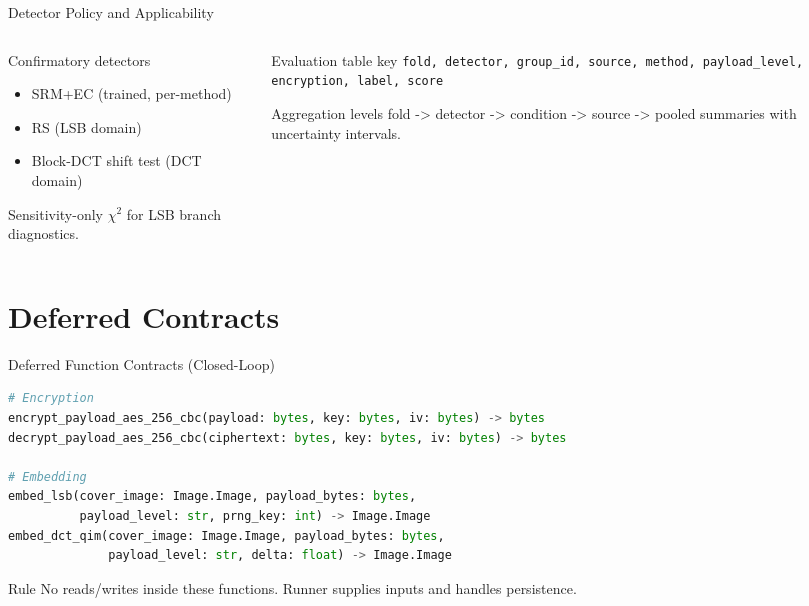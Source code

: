 \documentclass[aspectratio=169,11pt]{beamer}
\begin{document}
\begin{frame}{Detector Policy and Applicability}
\small
\begin{columns}[T]
\begin{column}{0.48\textwidth}
\begin{block}{Confirmatory detectors}
\begin{itemize}
\item SRM+EC (trained, per-method)
\item RS (LSB domain)
\item Block-DCT shift test (DCT domain)
\end{itemize}
\end{block}
\begin{exampleblock}{Sensitivity-only}
\small
\(\chi^2\) for LSB branch diagnostics.
\end{exampleblock}
\end{column}
\begin{column}{0.48\textwidth}
\begin{block}{Evaluation table key}
\scriptsize
\texttt{fold, detector, group\_id, source, method, payload\_level, encryption, label, score}
\end{block}
\begin{alertblock}{Aggregation levels}
\small
fold -> detector -> condition -> source -> pooled summaries with uncertainty intervals.
\end{alertblock}
\end{column}
\end{columns}
\end{frame}

\section{Deferred Contracts}

\begin{frame}[fragile]{Deferred Function Contracts (Closed-Loop)}
\tiny
\begin{lstlisting}[language=Python]
# Encryption
encrypt_payload_aes_256_cbc(payload: bytes, key: bytes, iv: bytes) -> bytes
decrypt_payload_aes_256_cbc(ciphertext: bytes, key: bytes, iv: bytes) -> bytes

# Embedding
embed_lsb(cover_image: Image.Image, payload_bytes: bytes,
          payload_level: str, prng_key: int) -> Image.Image
embed_dct_qim(cover_image: Image.Image, payload_bytes: bytes,
              payload_level: str, delta: float) -> Image.Image
\end{lstlisting}
\begin{alertblock}{Rule}
{\scriptsize No reads/writes inside these functions. Runner supplies inputs and handles persistence.}
\end{alertblock}
\end{frame}
\end{document}
